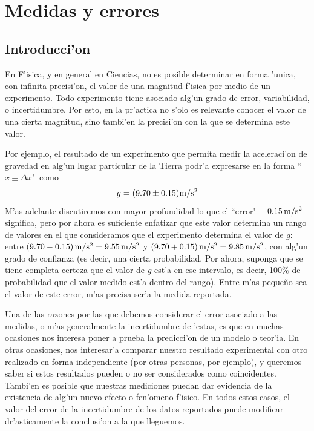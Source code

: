 \documentclass[letterpaper,11pt]{report}
\begin{document}
\chapter{Medidas y errores}

\section{Introducci'on}

En F'isica, y en general en Ciencias, no es posible determinar en forma 'unica, con infinita precisi'on, el valor de una magnitud f'isica por medio de un experimento. Todo experimento tiene asociado alg'un grado de error, variabilidad, o incertidumbre. Por esto, en la pr'actica no s'olo es relevante conocer el valor de una cierta magnitud, sino tambi'en la precisi'on con la que se determina este valor. 

Por ejemplo, el resultado de un experimento que permita medir la aceleraci'on de gravedad en alg'un lugar particular de la Tierra podr'a expresarse en la forma ``$x\pm\Delta x$"\, como
\begin{equation}
g = (9.70\pm 0.15) {\rm m/s^2}
\end{equation}
M'as adelante discutiremos con mayor profundidad lo que el ``error"\, $\pm 0.15\rm \,m/s^2$ significa, pero por ahora es suficiente enfatizar que este valor determina un rango de valores en el que consideramos que el experimento determina el valor de $g$: entre $(9.70-0.15)\,{\rm m/s^2} = 9.55\,{\rm m/s^2}$ y $(9.70+0.15)\,{\rm m/s^2} = 9.85 \,{\rm m/s^2}$, con alg'un grado de confianza (es decir, una cierta probabilidad. Por ahora, suponga que se tiene completa certeza que el valor de $g$ est'a en ese intervalo, es decir, 100\% de probabilidad que el valor medido est'a dentro del rango). Entre m'as peque\~no sea el valor de este error, m'as precisa ser'a la medida reportada.

Una de las razones por las que debemos considerar el error asociado a las medidas, o m'as generalmente la incertidumbre de 'estas, es que en muchas ocasiones nos interesa poner a prueba la predicci'on de un modelo o teor'ia. En otras ocasiones, nos interesar'a comparar nuestro resultado experimental con otro realizado en forma independiente (por otras personas, por ejemplo), y queremos saber si estos resultados pueden o no ser considerados como coincidentes. Tambi'en es posible que nuestras mediciones puedan dar evidencia de la existencia de alg'un nuevo efecto o fen'omeno f'isico. En todos estos casos, el valor del error de la incertidumbre de los datos reportados puede modificar dr'asticamente la conclusi'on a la que lleguemos.
\end{document}
